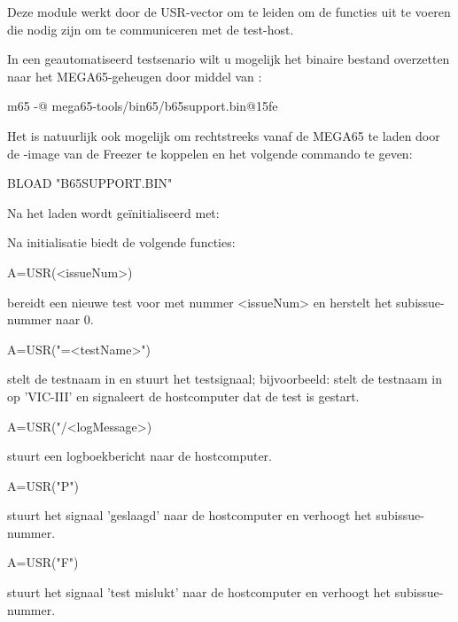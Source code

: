 Deze module werkt door de USR-vector om te leiden om de functies
uit te voeren die nodig zijn om te communiceren met de test-host.

In een geautomatiseerd testsenario wilt u mogelijk het binaire bestand 
overzetten naar het MEGA65-geheugen door middel van :

    \begin{screencode}
        m65 -@ mega65-tools/bin65/b65support.bin@15fe
    \end{screencode}


Het is natuurlijk ook mogelijk om  rechtstreeks vanaf de
MEGA65 te laden door de -image van de Freezer te koppelen en het volgende commando te geven:

\begin{screencode}
    BLOAD "B65SUPPORT.BIN"
\end{screencode}

Na het laden wordt  geïnitialiseerd met:


Na initialisatie biedt  de volgende functies:

\begin{screencode}
    A=USR(<issueNum>)
\end{screencode}
bereidt een nieuwe test voor met nummer <issueNum> en herstelt het subissue-nummer naar 0.

\begin{screencode}
    A=USR("=<testName>")
\end{screencode}
stelt de testnaam in en stuurt het testsignaal; bijvoorbeeld: 
stelt de testnaam in op 'VIC-III' en signaleert de hostcomputer dat de test
is gestart.

\begin{screencode}
    A=USR("/<logMessage>)
\end{screencode}
stuurt een logboekbericht naar de hostcomputer.

\begin{screencode}
    A=USR("P")
\end{screencode}
stuurt het signaal 'geslaagd' naar de hostcomputer en verhoogt het subissue-nummer.

\begin{screencode}
    A=USR("F")
\end{screencode}
stuurt het signaal 'test mislukt' naar de hostcomputer en verhoogt
het subissue-nummer.

